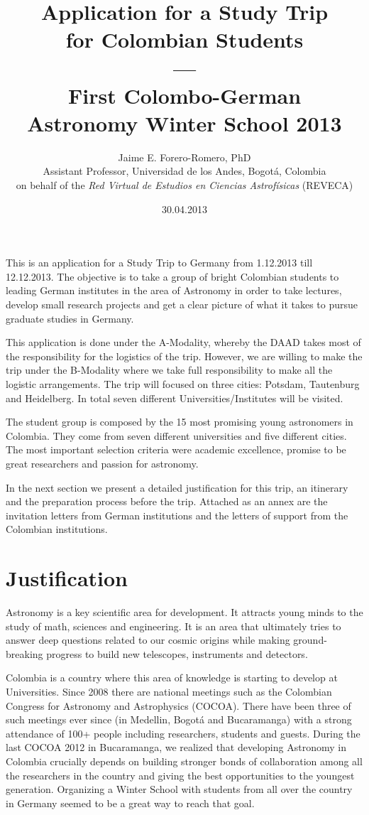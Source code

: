 \documentclass[12pt]{article}
\title{Application for a Study Trip \\ for Colombian
  Students\\---\\ First Colombo-German \\ Astronomy Winter School 2013}
\author{Jaime E. Forero-Romero, PhD \\ {\small Assistant Professor, Universidad de los Andes, Bogot\'a, Colombia}\\
{\small on behalf of the {\textit{Red Virtual de Estudios en Ciencias Astrof\'isicas}} (REVECA)}}
\date{30.04.2013}
\begin{document}
\maketitle
This is an application for a Study Trip to Germany from 1.12.2013 till
12.12.2013. The objective is to take a group of bright Colombian students to
leading German institutes in the area of Astronomy in order to take lectures,
develop small research projects and get a clear picture of what it
takes to pursue graduate studies in Germany. 

This application is done under the A-Modality, whereby the DAAD takes
most of the responsibility for the logistics of the trip. However, we
are willing to make the trip under the B-Modality where we take full
responsibility to make all the logistic arrangements. The trip will
focused on three cities: Potsdam, Tautenburg and Heidelberg. In total
seven different Universities/Institutes will be visited.

The student group is composed by the 15 most promising young
astronomers in Colombia. They come from seven different universities
and five different cities. The most important selection criteria were
academic excellence, promise to be great researchers and passion for
astronomy.  

In the next section we present a detailed justification for this trip,
an itinerary and the preparation process before the trip. Attached as
an annex are the invitation letters from German institutions and the
letters of support from the Colombian institutions.  

\newpage

\section{Justification}

Astronomy is a key scientific area for development. It attracts young
minds to the study of math, sciences and engineering. It is an area
that ultimately tries to answer deep questions related to our
cosmic origins while making ground-breaking progress to build new
telescopes, instruments and detectors.

Colombia is a country where this area of knowledge is starting to develop
at Universities. Since 2008 there are national meetings such as the
Colombian Congress for Astronomy and Astrophysics (COCOA). There have
been three of such meetings ever since (in Medellin, Bogot\'a and Bucaramanga)
with a strong attendance of 100+ people including researchers, students and guests. During the
last COCOA 2012 in Bucaramanga, we realized that developing Astronomy
in Colombia crucially depends on building stronger bonds of
collaboration among all the researchers in the country and giving the
best opportunities to the youngest generation. Organizing a Winter School
with students from all over the country in Germany seemed to be a
great way to reach that goal. 
\end{document}
